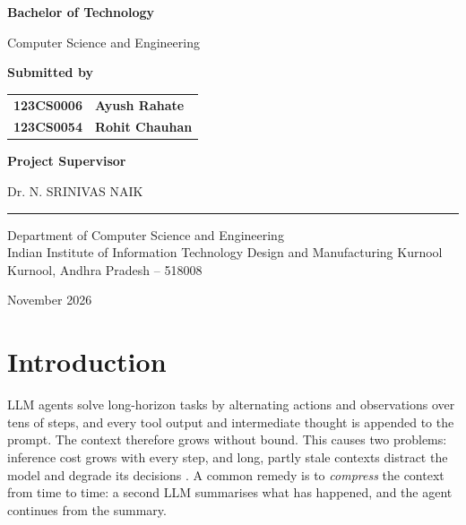 \documentclass[10pt,a4paper]{article}
\begin{document}
\begin{center}
{\Large\bfseries
Bachelor of Technology
}

\vspace{0.15cm}

{\large
Computer Science and Engineering
}

\vfill

{\large\bfseries
Submitted by
}

\vspace{0.35cm}

\renewcommand{\arraystretch}{1.35}

\begin{tabular}{c l}
\textbf{123CS0006} & \textbf{Ayush Rahate}\\
\textbf{123CS0054} & \textbf{Rohit Chauhan}
\end{tabular}

\vspace{1.0cm}

{\large\bfseries
Project Supervisor
}

\vspace{0.3cm}

{\large
Dr. N. SRINIVAS NAIK
}

\vfill

\rule{0.55\textwidth}{0.4pt}

\vspace{0.35cm}

{\normalsize
Department of Computer Science and Engineering\\
Indian Institute of Information Technology Design and Manufacturing Kurnool\\
Kurnool, Andhra Pradesh -- 518008\par
}

\vspace{0.35cm}

{\normalsize
November 2026
}

\end{center}

\newpage

\section{Introduction}

LLM agents solve long-horizon tasks by alternating actions and observations
over tens of steps, and every tool output and intermediate thought is appended
to the prompt. The context therefore grows without bound. This causes two
problems: inference cost grows with every step, and long, partly stale
contexts distract the model and degrade its decisions \cite{ACON}. A common
remedy is to \emph{compress} the context from time to time: a second LLM
summarises what has happened, and the agent continues from the summary.
\end{document}
